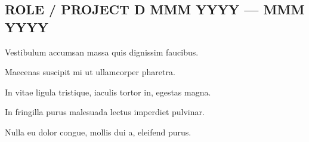 \subsection{{ROLE / PROJECT D \hfill MMM YYYY --- MMM YYYY}}
\begin{zitemize}
\item Vestibulum accumsan massa quis dignissim faucibus.
\item Maecenas suscipit mi ut ullamcorper pharetra.
\item In vitae ligula tristique, iaculis tortor in, egestas magna.
\item In fringilla purus malesuada lectus imperdiet pulvinar.
\item Nulla eu dolor congue, mollis dui a, eleifend purus.
\end{zitemize}

